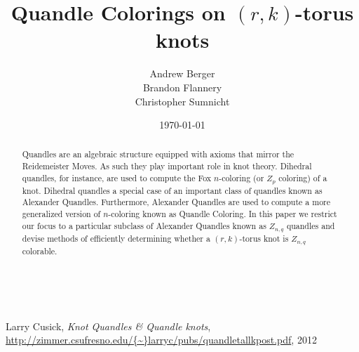 \documentclass[11pt]{article}
\title{Quandle Colorings on $(r,k)$-torus knots}
\author{
        Andrew Berger \\
	Brandon Flannery \\
	Christopher Sumnicht \\
}
\date{\today}
\theoremstyle{plain}
\theoremstyle{definition}
\begin{document}
\maketitle
\begin{abstract}
	Quandles are an algebraic structure equipped with axioms that mirror the Reidemeister Moves. As such they play important role in knot theory. Dihedral quandles, for instance, are used to compute the Fox $n$-coloring (or $Z_p$ coloring) of a knot. Dihedral quandles a special case of an important class of quandles known as Alexander Quandles. Furthermore, Alexander Quandles are used to compute a more generalized version of $n$-coloring known as Quandle Coloring.
In this paper we restrict our focus to a particular subclass of Alexander Quandles known as $Z_{n,q}$ quandles and  devise methods of efficiently determining whether a $(r,k)$-torus knot is $Z_{n,q}$ colorable.


\end{abstract}

\clearpage
\tableofcontents
\clearpage






\
\begin{thebibliography}{9}

  Larry Cusick,
  \emph{Knot Quandles \& Quandle knots},
  \url{http://zimmer.csufresno.edu/{~}larryc/pubs/quandletallkpost.pdf},
  2012
\end{thebibliography}
\end{document}
